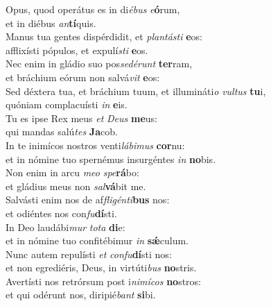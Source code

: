 \evenverse Opus, quod operátus es in di\textit{é}\textit{bus} \textit{e}\textbf{ó}rum,~\*\\
\evenverse et in diébus \textit{an}\textbf{tí}quis.\\
\oddverse Manus tua gentes dispérdidit, et \textit{plan}\textit{tá}\textit{sti} \textbf{e}os:~\*\\
\oddverse afflixísti pópulos, et expulí\textit{sti} \textbf{e}os.\\
\evenverse Nec enim in gládio suo pos\textit{se}\textit{dé}\textit{runt} \textbf{ter}ram,~\*\\
\evenverse et bráchium eórum non salvá\textit{vit} \textbf{e}os:\\
\oddverse Sed déxtera tua, et bráchium tuum, et illumináti\textit{o} \textit{vul}\textit{tus} \textbf{tu}i,~\*\\
\oddverse quóniam complacuísti \textit{in} \textbf{e}is.\\
\evenverse Tu es ipse Rex meus \textit{et} \textit{De}\textit{us} \textbf{me}us:~\*\\
\evenverse qui mandas salú\textit{tes} \textbf{Ja}cob.\\
\oddverse In te inimícos nostros venti\textit{lá}\textit{bi}\textit{mus} \textbf{cor}nu:~\*\\
\oddverse et in nómine tuo spernémus insurgéntes \textit{in} \textbf{no}bis.\\
\evenverse Non enim in arcu \textit{me}\textit{o} \textit{spe}\textbf{rá}bo:~\*\\
\evenverse et gládius meus non \textit{sal}\textbf{vá}bit me.\\
\oddverse Salvásti enim nos de af\textit{fli}\textit{gén}\textit{ti}\textbf{bus} nos:~\*\\
\oddverse et odiéntes nos con\textit{fu}\textbf{dí}sti.\\
\evenverse In Deo laudábi\textit{mur} \textit{to}\textit{ta} \textbf{di}e:~\*\\
\evenverse et in nómine tuo confitébimur \textit{in} \textbf{sǽ}culum.\\
\oddverse Nunc autem repulísti \textit{et} \textit{con}\textit{fu}\textbf{dí}sti nos:~\*\\
\oddverse et non egrediéris, Deus, in virtúti\textit{bus} \textbf{no}stris.\\
\evenverse Avertísti nos retrórsum post i\textit{ni}\textit{mí}\textit{cos} \textbf{no}stros:~\*\\
\evenverse et qui odérunt nos, diripié\textit{bant} \textbf{si}bi.\\
